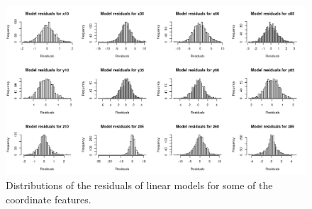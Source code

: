\documentclass[11pt,fleqn]{article}
\begin{document}
\begin{figure}[H]
	\centering
	\includegraphics[width=\textwidth]{residuals}
	\caption{Distributions of the residuals of linear models for some of the coordinate features.}\label{fig:residuals}
\end{figure}
\end{document}
